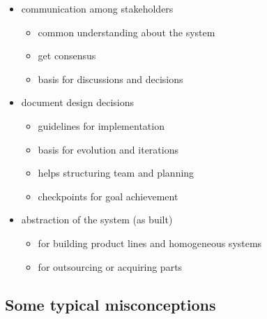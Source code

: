 \begin{itemize}
\tightlist
\item
  communication among stakeholders

  \begin{itemize}
  \tightlist
  \item
    common understanding about the system
  \item
    get consensus
  \item
    basis for discussions and decisions
  \end{itemize}
\item
  document design decisions

  \begin{itemize}
  \tightlist
  \item
    guidelines for implementation
  \item
    basis for evolution and iterations
  \item
    helps structuring team and planning
  \item
    checkpoints for goal achievement
  \end{itemize}
\item
  abstraction of the system (as built)

  \begin{itemize}
  \tightlist
  \item
    for building product lines and homogeneous systems
  \item
    for outsourcing or acquiring parts
  \end{itemize}
\end{itemize}

\hypertarget{some-typical-misconceptions}{%
\subsection{Some typical
misconceptions}\label{some-typical-misconceptions}}

